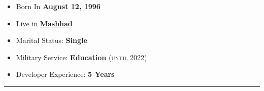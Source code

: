 \documentclass[8pt]{developercv} %
\begin{document}
\begin{minipage}[t]{0.5\textwidth} %
	\vspace{-\baselineskip} %

	\Large {
	\begin{itemize}
		\item {Born In \textbf{August 12, 1996}}
		\item {Live in
		\href{https://www.google.com/maps/place/Mashhad,+Razavi+Khorasan+Province,+Iran/@36.2976014,59.5092469,12z/data=!3m1!4b1!4m5!3m4!1s0x3f6c911abe4131d7:0xc9c57e3a9318753b!8m2!3d36.2619922!4d59.6173096}
		{\textbf{Mashhad}}}
		\item {Marital Status: \textbf{Single} }
		\item {Military Service: \textbf{Education} \normalsize{\textsc{(until 2022)}} }
		\item {Developer Experience: \textbf{ 5 Years}  }
	\end{itemize}
	}

\end{minipage}
\hfill %
\begin{minipage}[t]{0.4\textwidth} %
	\vspace{-\baselineskip} %
	\begin{barchart}{4.5}
	\end{barchart}
\end{minipage}

\begin{center}
\end{center}

\noindent\rule{\textwidth}{1pt}
\vspace{-\baselineskip} %

\end{document}
